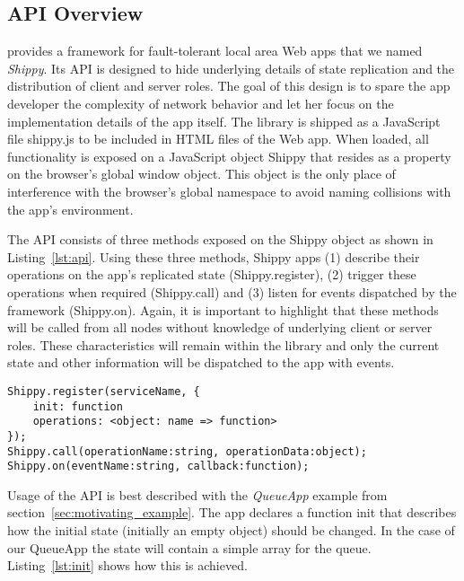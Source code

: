 \subsection{API Overview}
\label{sub:approach_api_overview}

\APIName provides a framework for fault-tolerant local area Web apps that we named \textit{Shippy}.
Its API is designed to hide underlying details of state replication and the distribution of client and server roles.
The goal of this design is to spare the app developer the complexity of network behavior and let her focus on the implementation details of the app itself.
The library is shipped as a JavaScript file {\ttfamily shippy.js} to be included in HTML files of the Web app.
When loaded, all functionality is exposed on a JavaScript object {\ttfamily Shippy} that resides as a property on the browser's global {\ttfamily window} object.
This object is the only place of interference with the browser's global namespace to avoid naming collisions with the app's environment.

The API consists of three methods exposed on the {\ttfamily Shippy} object as shown in Listing~\ref{lst:api}.
Using these three methods, Shippy apps (1) describe their operations on the app's replicated state ({\ttfamily Shippy.register}), (2) trigger these operations when required ({\ttfamily Shippy.call}) and (3) listen for events dispatched by the framework ({\ttfamily Shippy.on}).
Again, it is important to highlight that these methods will be called from all nodes without knowledge of underlying client or server roles.
These characteristics will remain within the library and only the current state and other information will be dispatched to the app with events.

\begin{lstlisting}[caption={\APIName API},label={lst:api}]
Shippy.register(serviceName, {
    init: function
    operations: <object: name => function>
});
Shippy.call(operationName:string, operationData:object);
Shippy.on(eventName:string, callback:function);
\end{lstlisting}

Usage of the API is best described with the \textit{QueueApp} example from section~\ref{sec:motivating_example}.
The app declares a function {\ttfamily init} that describes how the initial state (initially an empty object) should be changed.
In the case of our QueueApp the state will contain a simple array for the queue.
Listing~\ref{lst:init} shows how this is achieved.

